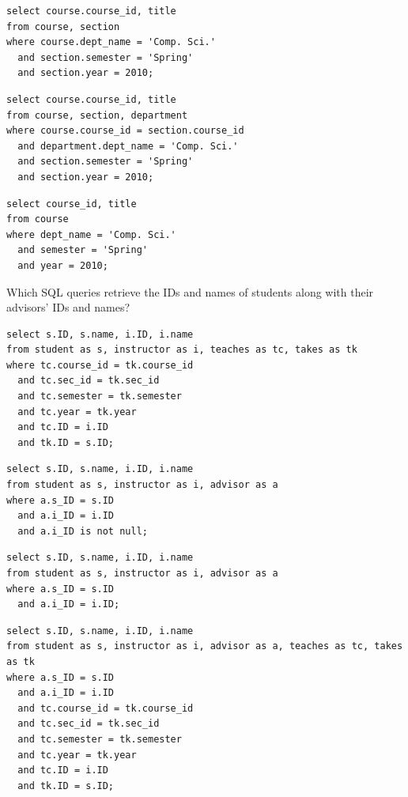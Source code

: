 \documentclass[12pt]{exam}
\begin{document}
\begin{questions}
\begin{checkboxes}
  \choice
\begin{verbatim}
select course.course_id, title
from course, section
where course.dept_name = 'Comp. Sci.'
  and section.semester = 'Spring'
  and section.year = 2010;
\end{verbatim}

  \choice
\begin{verbatim}
select course.course_id, title
from course, section, department
where course.course_id = section.course_id
  and department.dept_name = 'Comp. Sci.'
  and section.semester = 'Spring'
  and section.year = 2010;
\end{verbatim}

  \choice
\begin{verbatim}
select course_id, title
from course
where dept_name = 'Comp. Sci.'
  and semester = 'Spring'
  and year = 2010;
\end{verbatim}

\end{checkboxes}



\question[4] Which SQL queries retrieve the IDs and names of students along with their advisors' IDs and names?
\begin{checkboxes}

  \choice
\begin{verbatim}
select s.ID, s.name, i.ID, i.name
from student as s, instructor as i, teaches as tc, takes as tk
where tc.course_id = tk.course_id
  and tc.sec_id = tk.sec_id
  and tc.semester = tk.semester
  and tc.year = tk.year
  and tc.ID = i.ID
  and tk.ID = s.ID;
\end{verbatim}

  \CorrectChoice
\begin{verbatim}
select s.ID, s.name, i.ID, i.name
from student as s, instructor as i, advisor as a
where a.s_ID = s.ID
  and a.i_ID = i.ID
  and a.i_ID is not null;
\end{verbatim}

  \CorrectChoice
\begin{verbatim}
select s.ID, s.name, i.ID, i.name
from student as s, instructor as i, advisor as a
where a.s_ID = s.ID
  and a.i_ID = i.ID;
\end{verbatim}

  \choice
\begin{verbatim}
select s.ID, s.name, i.ID, i.name
from student as s, instructor as i, advisor as a, teaches as tc, takes as tk
where a.s_ID = s.ID
  and a.i_ID = i.ID
  and tc.course_id = tk.course_id
  and tc.sec_id = tk.sec_id
  and tc.semester = tk.semester
  and tc.year = tk.year
  and tc.ID = i.ID
  and tk.ID = s.ID;
\end{verbatim}


\end{checkboxes}
\end{questions}
\end{document}
